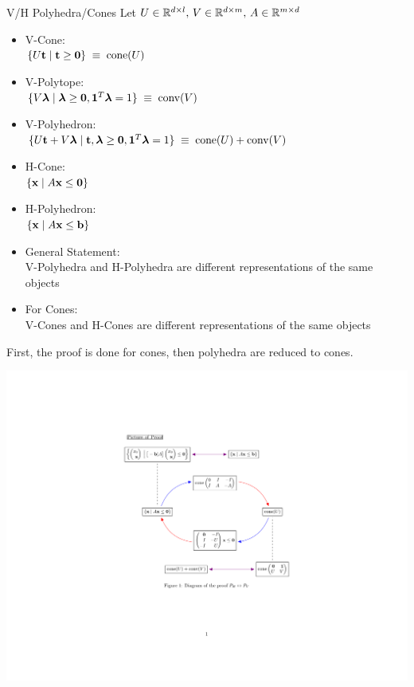 \documentclass{beamer}
\begin{document}
\begin{frame}{V/H Polyhedra/Cones}
	Let $U \in \mathbb{R}^{d\times l},\, V \in \mathbb{R}^{d\times m},\, A \in \mathbb{R}^{m\times d}$
	\begin{itemize}
		\item V-Cone:\\ $\{U\mathbf{t} \;|\; \mathbf{t} \geq \mathbf{0}\} \;\equiv\; \operatorname{cone}(U)$
		\item V-Polytope:\\ $\{V\bm{\lambda} \;|\; \bm{\lambda} \geq \mathbf{0}, \mathbf{1}^T\bm{\lambda} = 1\} \;\equiv\; \operatorname{conv}(V)$
		\item V-Polyhedron:\\ $\{U\mathbf{t} + V\bm{\lambda} \;|\; \mathbf{t},\bm{\lambda} \geq \mathbf{0}, \mathbf{1}^T\bm{\lambda} = 1\} \;\equiv\; \operatorname{cone}(U) + \operatorname{conv}(V)$
		\item H-Cone:\\ $\{\mathbf{x} \;|\; A\mathbf{x} \leq \mathbf{0} \}$
		\item H-Polyhedron:\\ $\{\mathbf{x} \;|\; A\mathbf{x} \leq \mathbf{b} \}$
	\end{itemize}
\end{frame}

\begin{frame}{\MWT}
	\begin{itemize}
		\item General Statement: \\
		      V-Polyhedra and H-Polyhedra are different representations of the same objects
		      \pause
		\item For Cones: \\
		      V-Cones and H-Cones are different representations of the same objects
		      \pause
	\end{itemize}
	First, the proof is done for cones, then polyhedra are reduced to cones.
\end{frame}

\pgfmathsetmacro{}
\begin{frame}
\includegraphics[width = {\picwidth}pt, trim=6cm 0 0 4cm, page=1]{proof_picture_landscape.pdf}
\end{frame}
\end{document}
